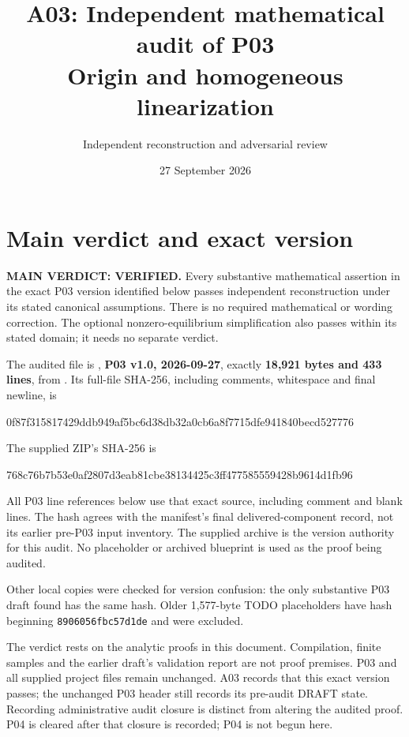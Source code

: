 \documentclass[11pt]{article}
\title{A03: Independent mathematical audit of P03\\Origin and homogeneous linearization}
\author{Independent reconstruction and adversarial review}
\date{27 September 2026}
\newcommand{\sha}[2]{\par{\small\ttfamily #1\allowbreak #2}\par}
\begin{document}
\maketitle

\section{Main verdict and exact version}
\textbf{MAIN VERDICT: VERIFIED.}
Every substantive mathematical assertion in the exact P03 version identified
below passes independent reconstruction under its stated canonical assumptions.
There is no required mathematical or wording correction. The optional
nonzero-equilibrium simplification also passes within its stated domain;
it needs no separate verdict.

The audited file is ,
\textbf{P03 v1.0, 2026-09-27}, exactly \textbf{18,921 bytes and 433 lines},
from . Its full-file SHA-256,
including comments, whitespace and final newline, is
\sha{0f87f315817429ddb949af5bc6d38db32}{a0cb6a8f7715dfe941840becd527776}
The supplied ZIP's SHA-256 is
\sha{768c76b7b53e0af2807d3eab81cbe381}{34425c3ff477585559428b9614d1fb96}
All P03 line references below use that exact source, including comment and
blank lines. The hash agrees with the manifest's final delivered-component
record, not its earlier pre-P03 input inventory. The supplied archive is the
version authority for this audit. No placeholder or archived blueprint is used
as the proof being audited.

Other local copies were checked for version confusion: the only substantive
P03 draft found has the same hash. Older 1,577-byte TODO placeholders have
hash beginning \texttt{8906056fbc57d1de} and were excluded.

The verdict rests on the analytic proofs in this document. Compilation,
finite samples and the earlier draft's validation report are not proof
premises. P03 and all supplied project files remain unchanged. A03 records
that this exact version passes; the unchanged P03 header still records its
pre-audit DRAFT state. Recording administrative audit closure is distinct from
altering the audited proof. P04 is cleared after that closure is recorded;
P04 is not begun here.
\end{document}

